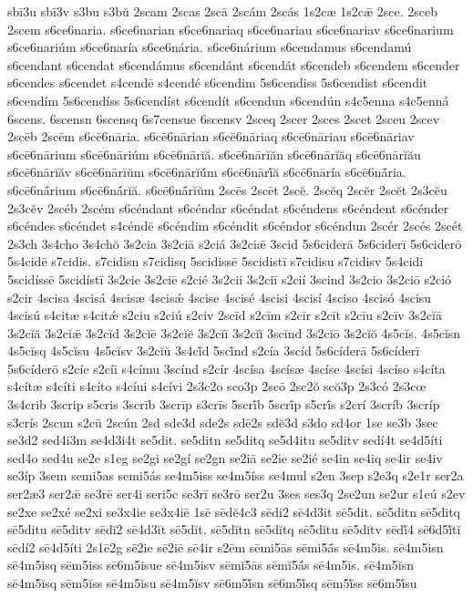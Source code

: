 {sbī3u
sbī3v
s3bu
s3bŭ
2scam
2scas
2scā
2scám
2scás
1s2cæ
1s2cǣ
2sce.
2sceb
2scem
s6ce6naria.
s6ce6narian
s6ce6nariaq
s6ce6nariau
s6ce6nariav
s6ce6narium
s6ce6nariúm
s6ce6naría
s6ce6nária.
s6ce6nárium
s6cendamus
s6cendamú
s6cendant
s6cendat
s6cendámus
s6cendánt
s6cendát
s6cendeb
s6cendem
s6cender
s6cendes
s6cendet
s4cendē
s4cendé
s6cendim
5s6cendiss
5s6cendist
s6cendit
s6cendím
5s6cendíss
5s6cendíst
s6cendít
s6cendun
s6cendún
s4c5enna
s4c5enná
6scens.
6scensn
6scensq
6s7censue
6scensv
2sceq
2scer
2sces
2scet
2sceu
2scev
2scēb
2scēm
s6cē6nāria.
s6cē6nārian
s6cē6nāriaq
s6cē6nāriau
s6cē6nāriav
s6cē6nārium
s6cē6nāriúm
s6cē6nārĭă.
s6cē6nārĭăn
s6cē6nārĭăq
s6cē6nārĭău
s6cē6nārĭăv
s6cē6nārĭŭm
s6cē6nārĭŭ́m
s6cē6nārĭ́ă
s6cē6nāría
s6cē6nā́ria.
s6cē6nā́rium
s6cē6nā́rĭă.
s6cē6nā́rĭŭm
2scēs
2scēt
2scĕ.
2scĕq
2scĕr
2scĕt
2s3cĕu
2s3cĕv
2scéb
2scém
s6céndant
s6céndar
s6céndat
s6céndens
s6céndent
s6cénder
s6céndes
s6céndet
s4céndē
s6céndim
s6céndit
s6céndor
s6céndun
2scér
2scés
2scét
2s3ch
3s4cho
3s4chŏ
3s2cia
3s2ciā
s2ciá
3s2ciǣ
3scid
5s6ciderā
5s6ciderī
5s6ciderō
5s4cidē
s7cidis.
s7cidisn
s7cidisq
5scidissē
5scidistī
s7cidisu
s7cidisv
5s4cidī
5scidíssē
5scidístī
3s2cie
3s2ciē
s2cié
3s2cii
3s2ciī
s2cií
3scind
3s2cio
3s2ciō
s2ció
s2cir
4scisa
4scisá
4scisæ
4scisǽ
4scise
4scisé
4scisi
4scisí
4sciso
4scisó
4scisu
4scisú
s4citæ
s4citǽ
s2ciu
s2ciú
s2civ
2scīd
s2cīm
s2cīr
s2cīt
s2cīu
s2cīv
3s2cĭā
3s2cĭă
3s2cĭǣ
3s2cĭd
3s2cĭē
3s2cĭĕ
3s2cĭī
3s2cĭĭ
3scĭnd
3s2cĭō
3s2cĭŏ
4s5cĭs.
4s5cĭsn
4s5cĭsq
4s5cĭsu
4s5cĭsv
3s2cĭŭ
3s4cĭ́d
5scĭ́nd
s2cía
3scíd
5s6cíderā
5s6cíderī
5s6cíderō
s2cíe
s2cíi
s4címu
3scínd
s2cír
4scísa
4scísæ
4scíse
4scísi
4scíso
s4cíta
s4cítæ
s4cíti
s4cíto
s4cíui
s4cívi
2s3c2o
sco3p
2scō
2sc2ŏ
scŏ3p
2s3có
2s3cœ
3s4crib
3scrip
s5cris
3scrīb
3scrīp
s3crīs
5scrī́b
5scrī́p
s5crī́s
s2crí
3scríb
3scríp
s3crís
2scun
s2cū
2scún
2sd
sde3d
sde2s
sdē2s
sdĕ3d
s3do
sd4or
1se
se3b
3sec
se3d2
sed4i3m
se4d3i4t
se5dit.
se5ditn
se5ditq
se5d4itu
se5ditv
sedí4t
se4d5íti
sed4o
sed4u
se2e
s1eg
se2gi
se2gí
se2gn
se2iā
se2ie
se2ié
se4in
se4iq
se4ir
se4iv
se3íp
3sem
semi5as
semi5ás
se4m5iss
se4m5íss
se4mul
s2en
3sep
s2e3q
s2e1r
ser2a
ser2æ3
ser2ǣ
se3rē
ser4i
seri5c
se3rī
se3rō
ser2u
3ses
ses3q
2se2un
se2ur
s1eú
s2ev
se2xe
se2xé
se2xi
se3x4ie
se3x4iē
1sē
sēdĕ4c3
sēdi2
sē4d3it
sē5dit.
sē5ditn
sē5ditq
sē5ditu
sē5ditv
sēdĭ2
sē4d3ĭt
sē5dĭt.
sē5dĭtn
sē5dĭtq
sē5dĭtu
sē5dĭtv
sēdĭ́4
sē6d5ĭ́tĭ
sēdí2
sē4d5íti
2s1ē2g
sē2ie
sē2iē
sē4ir
s2ēm
sēmi5ās
sēmi5ā́s
sē4m5is.
sē4m5isn
sē4m5isq
sēm5iss
sē6m5isue
sē4m5isv
sēmĭ5ās
sēmĭ5ā́s
sē4m5ĭs.
sē4m5ĭsn
sē4m5ĭsq
sēm5ĭss
sē4m5ĭsu
sē4m5ĭsv
sē6m5ĭ́sn
sē6m5ĭ́sq
sēm5ĭ́ss
sē6m5ĭ́su
}
